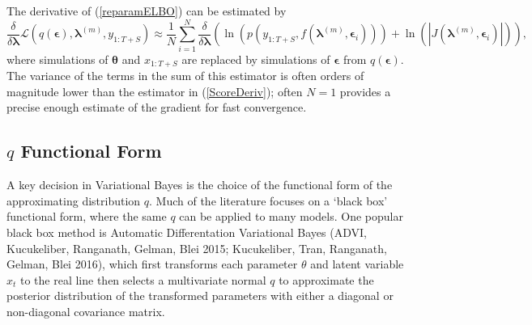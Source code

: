 \documentclass[12pt,a4paper]{article}%
\numberwithin{equation}{section}
\begin{document}
The derivative of (\ref{reparamELBO}) can be estimated by
\begin{equation}
\label{ReparamDeriv}
\frac{\delta}{\delta\boldsymbol{\lambda}}\mathcal{L}(q(\boldsymbol{\epsilon}), \boldsymbol{\lambda}^{(m)}, y_{1:T+S}) \approx \frac{1}{N}\sum_{i=1}^{N} \frac{\delta}{\delta\boldsymbol{\lambda}} \left( \ln (p(y_{1:T+S}, f(\boldsymbol{\lambda}^{(m)}, \boldsymbol{\epsilon}_i))) + \ln(|J(\boldsymbol{\lambda}^{(m)}, \boldsymbol{\epsilon}_i)|) \right),
\end{equation}
where simulations of $\boldsymbol{\theta}$ and $x_{1:T+S}$ are replaced by simulations of $\boldsymbol{\epsilon}$ from $q(\boldsymbol{\epsilon})$. The variance of the terms in the sum of this estimator is often orders of magnitude lower than the estimator in (\ref{ScoreDeriv}); often $N = 1$ provides a precise enough estimate of the gradient for fast convergence.

\subsection{$q$ Functional Form}
A key decision in Variational Bayes is the choice of the functional form of the approximating distribution $q$. Much of the literature focuses on a `black box' functional form, where the same $q$ can be applied to many models. One popular black box method is Automatic Differentation Variational Bayes (ADVI, Kucukeliber, Ranganath, Gelman, Blei 2015; Kucukeliber, Tran, Ranganath, Gelman, Blei 2016), which first transforms each parameter $\theta$ and latent variable $x_t$ to the real line then selects a multivariate normal $q$ to approximate the posterior distribution of the transformed parameters with either a diagonal or non-diagonal covariance matrix.  
\end{document}
